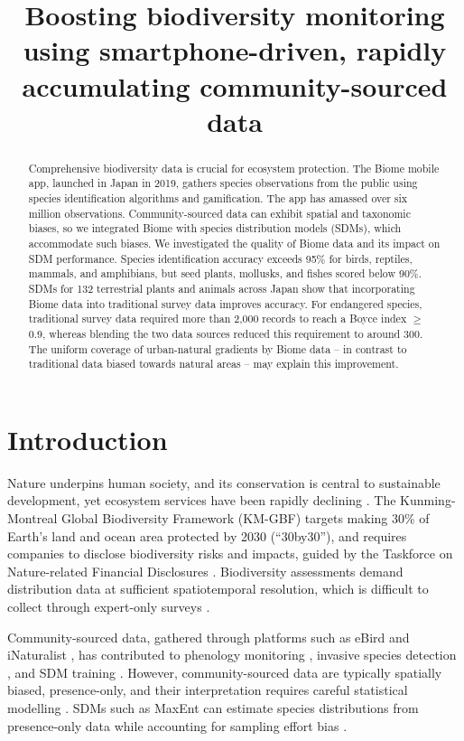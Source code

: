 \documentclass[11pt]{article}
\title{Boosting biodiversity monitoring using smartphone-driven, rapidly accumulating community-sourced data}
\author{}
\date{}
\begin{document}
\maketitle

\begin{abstract}
Comprehensive biodiversity data is crucial for ecosystem protection. The Biome mobile app, launched in Japan in 2019, gathers species observations from the public using species identification algorithms and gamification. The app has amassed over six million observations. Community-sourced data can exhibit spatial and taxonomic biases, so we integrated Biome with species distribution models (SDMs), which accommodate such biases. We investigated the quality of Biome data and its impact on SDM performance. Species identification accuracy exceeds 95\% for birds, reptiles, mammals, and amphibians, but seed plants, mollusks, and fishes scored below 90\%. SDMs for 132 terrestrial plants and animals across Japan show that incorporating Biome data into traditional survey data improves accuracy. For endangered species, traditional survey data required more than 2,000 records to reach a Boyce index $\geq$ 0.9, whereas blending the two data sources reduced this requirement to around 300. The uniform coverage of urban-natural gradients by Biome data -- in contrast to traditional data biased towards natural areas -- may explain this improvement.
\end{abstract}

\section{Introduction}
Nature underpins human society, and its conservation is central to sustainable development, yet ecosystem services have been rapidly declining \citep{ipbes2019,loh2005,newbold2016}. The Kunming-Montreal Global Biodiversity Framework (KM-GBF) targets making 30\% of Earth's land and ocean area protected by 2030 (``30by30''), and requires companies to disclose biodiversity risks and impacts, guided by the Taskforce on Nature-related Financial Disclosures \citep{tnfd2023}. Biodiversity assessments demand distribution data at sufficient spatiotemporal resolution, which is difficult to collect through expert-only surveys \citep{miya2022,mori2023,pocock2018}.

Community-sourced data, gathered through platforms such as eBird and iNaturalist \citep{chandler2017,wood2011}, has contributed to phenology monitoring \citep{fuccillo2022,klinger2023}, invasive species detection \citep{larson2020,roy2023,wallace2014}, and SDM training \citep{chandler2017,feldman2021,johnston2018,steen2019}. However, community-sourced data are typically spatially biased, presence-only, and their interpretation requires careful statistical modelling \citep{feldman2021,steen2019}. SDMs such as MaxEnt \citep{phillips2006,phillips2008} can estimate species distributions from presence-only data while accounting for sampling effort bias \citep{milanesi2020,phillips2009}.
\end{document}

